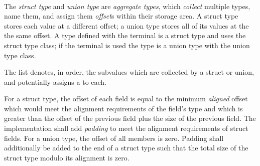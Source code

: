 \begin{grammar}
 \\
	  \terminal{\{}  \terminal{\}} \\
	 \terminal{\{}  \terminal{\}} \\

 \\
	 \optional{\terminal{,}} \\
	 \terminal{,}  \\

 \\
	  \terminal{:}  \\
	  \\
	  \\

 \\
	 \terminal{(}  \terminal{)}
\end{grammar}

\specsubsubitem
The \textit{struct type} and \textit{union type} are \textit{aggregate types},
which \textit{collect} multiple types, name them, and assign them
\textit{offset}s within their storage area. A struct type stores each value at a
different offset; a union type stores all of its values at the the same offset.
A type defined with the  terminal is a struct type and uses the
struct type class; if the  terminal is used the type is a union
type with the union type class.

\specsubsubitem
The  list denotes, in order, the subvalues
which are collected by a struct or union, and potentially assigns a
 to each.

\specsubsubitem
For a struct type, the offset of each field is equal to the minimum
\textit{aligned} offset which would meet the alignment requirements of the
field's type and which is greater than the offset of the previous field plus the
size of the previous field. The implementation shall add \textit{padding} to
meet the alignment requirements of struct fields. For a union type, the offset
of all members is zero. Padding shall additionally be added to the end of a
struct type such that the total size of the struct type modulo its alignment is
zero.

